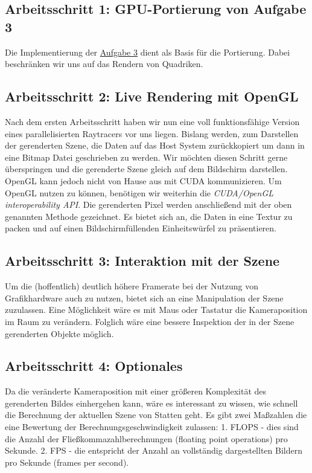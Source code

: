 \documentclass[10pt]{article}
\begin{document}
\begin{multicols}{2}
\subsection{Arbeitsschritt 1: GPU-Portierung von Aufgabe 3}
Die Implementierung der \href{https://github.com/plattenschieber/HSCGV_Uebungen/tree/master/hscgv_uebung_3}{Aufgabe 3} dient als Basis für die Portierung. Dabei beschränken wir uns auf das Rendern von Quadriken. 

\subsection{Arbeitsschritt 2: Live Rendering mit OpenGL}
Nach dem ersten Arbeitsschritt haben wir nun eine voll funktionsfähige Version eines parallelisierten Raytracers vor uns liegen. Bislang werden, zum Darstellen der gerenderten Szene, die Daten auf das Host System zurückkopiert um dann in eine Bitmap Datei geschrieben zu werden.
Wir möchten diesen Schritt gerne überspringen und die gerenderte Szene gleich auf dem Bildschirm darstellen. OpenGL kann jedoch nicht von Hause aus mit CUDA kommunizieren. Um OpenGL nutzen zu können, benötigen wir weiterhin die \textit{CUDA/OpenGL interoperability API}. Die gerenderten Pixel werden anschließend mit der oben genannten Methode gezeichnet. Es bietet sich an, die Daten in eine Textur zu packen und auf einen Bildschirmfüllenden Einheitswürfel zu präsentieren. 

\subsection{Arbeitsschritt 3: Interaktion mit der Szene}
Um die (hoffentlich) deutlich höhere Framerate bei der Nutzung von Grafikhardware auch zu nutzen, bietet sich an eine Manipulation der Szene zuzulassen. Eine Möglichkeit wäre es mit Maus oder Tastatur die Kameraposition im Raum zu verändern. Folglich wäre eine bessere Inspektion der in der Szene gerenderten Objekte möglich. 

\subsection{Arbeitsschritt 4: Optionales}
Da die veränderte Kameraposition mit einer größeren Komplexität des gerenderten Bildes einhergehen kann, wäre es interessant zu wissen, wie schnell die Berechnung der aktuellen Szene von Statten geht. Es gibt zwei Maßzahlen die eine Bewertung der Berechnungsgeschwindigkeit zulassen: 
1. FLOPS - dies sind die Anzahl der Fließkommazahlberechnungen (floating point operations) pro Sekunde. 
2. FPS - die entspricht der Anzahl an vollständig dargestellten Bildern pro Sekunde (frames per second).



\end{multicols}
\end{document}
